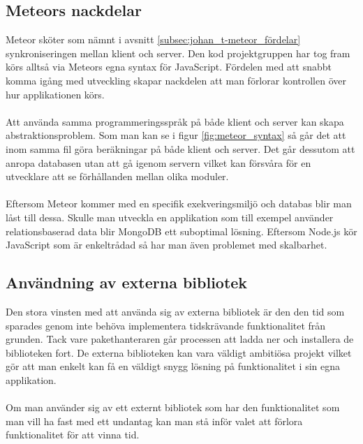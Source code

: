 \subsection{Meteors nackdelar}
\label{subsec:johan_t-meteor_nackdelar}
Meteor sköter som nämnt i avsnitt \ref{subsec:johan_t-meteor_fördelar} synkroniseringen mellan klient och server. Den kod projektgruppen har tog fram körs alltså via Meteors egna syntax för JavaScript. Fördelen med att snabbt komma igång med utveckling skapar nackdelen att man förlorar kontrollen över hur applikationen körs. 
\\ \\
Att använda samma programmeringsspråk på både klient och server kan skapa abstraktionsproblem. Som man kan se i figur \ref{fig:meteor_syntax} så går det att inom samma fil göra beräkningar på både klient och server. Det går dessutom att anropa databasen utan att gå igenom servern vilket kan försvåra för en utvecklare att se förhållanden mellan olika moduler. 
\\ \\
Eftersom Meteor kommer med en specifik exekveringsmiljö och databas blir man låst till dessa. Skulle man utveckla en applikation som till exempel använder relationsbaserad data blir MongoDB ett suboptimal lösning. Eftersom Node.js kör JavaScript som är enkeltrådad så har man även problemet med skalbarhet. 
\subsection{Användning av externa bibliotek}
\label{subsec:johan_t-bibliotek}
Den stora vinsten med att använda sig av externa bibliotek är den den tid som sparades genom inte behöva implementera tidskrävande funktionalitet från grunden. Tack vare pakethanteraren går processen att ladda ner och installera de biblioteken fort. De externa biblioteken kan vara väldigt ambitiösa projekt vilket gör att man enkelt kan få en väldigt snygg lösning på funktionalitet i sin egna applikation.
\\ \\
Om man använder sig av ett externt bibliotek som har den funktionalitet som man vill ha fast med ett undantag kan man stå inför valet att förlora funktionalitet för att vinna tid.

